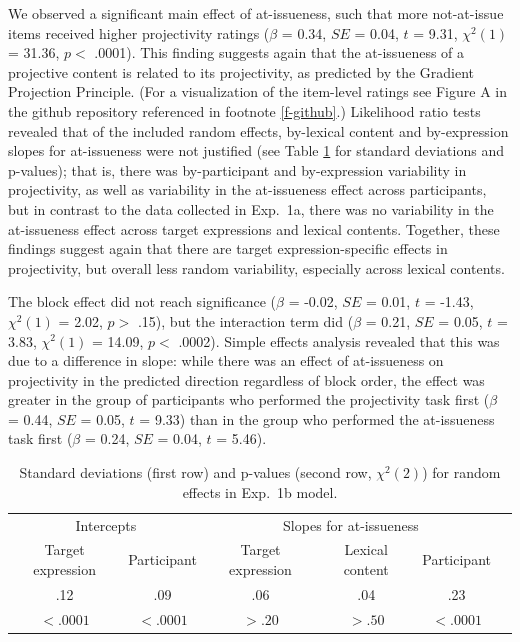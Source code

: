 \documentclass[11pt,fleqn]{article}
\newcommand{\6}{\mbox{$[\hspace*{-.6mm}[$}}
\newcommand{\9}{\mbox{$]\hspace*{-.6mm}]$}}
\newcommand{\tableref}[1]{Table \ref{#1}}
\begin{document}
We observed a significant main effect of at-issueness, such that more not-at-issue items received higher projectivity ratings ($\beta$ = 0.34, $SE$ = 0.04, $t$ = 9.31, $\chi^2(1)$ = 31.36, $p <$ .0001). This finding suggests again that the at-issueness of a projective content is related to its projectivity, as predicted by the Gradient Projection Principle. (For a visualization of the item-level ratings see Figure A in the github repository referenced in footnote \ref{f-github}.)  Likelihood ratio tests revealed that of the included random effects, by-lexical content and by-expression slopes for at-issueness were not justified (see \tableref{tab:random1b} for standard deviations and p-values); that is, there was by-participant and by-expression variability in projectivity, as well as variability in the at-issueness effect across participants, but in contrast to the data collected in Exp.~1a, there was no variability in the at-issueness effect across target expressions and lexical contents. Together, these findings suggest again that there are target expression-specific effects in projectivity, but overall less random variability, especially across lexical contents. 

The block effect did not reach significance ($\beta$ = -0.02, $SE$ = 0.01, $t$ = -1.43, $\chi^2(1)$ = 2.02, $p >$ .15), but the interaction term did ($\beta$ = 0.21, $SE$ = 0.05, $t$ = 3.83, $\chi^2(1)$ = 14.09, $p <$ .0002). Simple effects analysis revealed that this was due to a difference in slope: while there was an effect of at-issueness on projectivity in the predicted direction regardless of block order, the effect was greater in the group of participants who performed the projectivity task first ($\beta$ = 0.44, $SE$ = 0.05, $t$ = 9.33) than in the group who performed the at-issueness task first ($\beta$ = 0.24, $SE$ = 0.04, $t$ = 5.46).


\begin{table}
\begin{center}
\begin{tabular}{c c c c c c }
\toprule
\multicolumn{2}{c}{Intercepts} & \multicolumn{3}{c}{Slopes for at-issueness}\\
Target expression & Participant & Target expression & Lexical content & Participant\\
\midrule
.12 & .09 & .06 & .04 & .23\\
$< .0001$ & $< .0001$ & $> .20$ & $> .50$ & $< .0001$ \\
\bottomrule
\end{tabular}
\caption{Standard deviations (first row) and p-values (second row, $\chi^2(2)$) for random effects in Exp.~1b model.}\label{tab:random1b}
\end{center}
\end{table}
\end{document}
